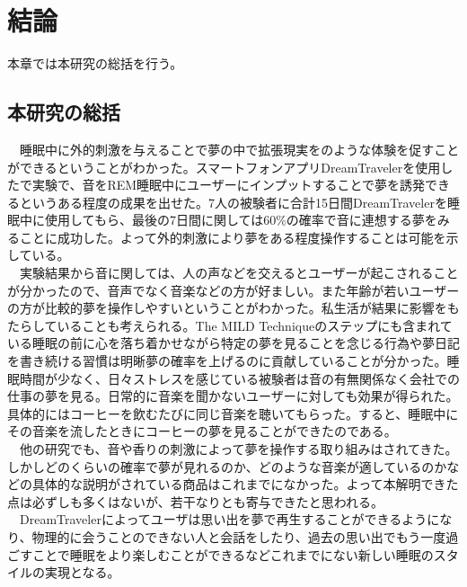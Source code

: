 \chapter{結論}
\label{chap:result}

本章では本研究の総括を行う。

\section{本研究の総括}
　睡眠中に外的刺激を与えることで夢の中で拡張現実をのような体験を促すことができるということがわかった。スマートフォンアプリDreamTravelerを使用したで実験で、音をREM睡眠中にユーザーにインプットすることで夢を誘発できるというある程度の成果を出せた。7人の被験者に合計15日間DreamTravelerを睡眠中に使用してもら、最後の7日間に関しては60\%の確率で音に連想する夢をみることに成功した。よって外的刺激により夢をある程度操作することは可能を示している。\\
　実験結果から音に関しては、人の声などを交えるとユーザーが起こされることが分かったので、音声でなく音楽などの方が好ましい。また年齢が若いユーザーの方が比較的夢を操作しやすいということがわかった。私生活が結果に影響をもたらしていることも考えられる。The MILD Techniqueのステップにも含まれている睡眠の前に心を落ち着かせながら特定の夢を見ることを念じる行為や夢日記を書き続ける習慣は明晰夢の確率を上げるのに貢献していることが分かった。睡眠時間が少なく、日々ストレスを感じている被験者は音の有無関係なく会社での仕事の夢を見る。日常的に音楽を聞かないユーザーに対しても効果が得られた。具体的にはコーヒーを飲むたびに同じ音楽を聴いてもらった。すると、睡眠中にその音楽を流したときにコーヒーの夢を見ることができたのである。\\
　他の研究でも、音や香りの刺激によって夢を操作する取り組みはされてきた。しかしどのくらいの確率で夢が見れるのか、どのような音楽が適しているのかなどの具体的な説明がされている商品はこれまでになかった。よって本解明できた点は必ずしも多くはないが、若干なりとも寄与できたと思われる。
　DreamTravelerによってユーザは思い出を夢で再生することができるようになり、物理的に会うことのできない人と会話をしたり、過去の思い出でもう一度過ごすことで睡眠をより楽しむことができるなどこれまでにない新しい睡眠のスタイルの実現となる。

